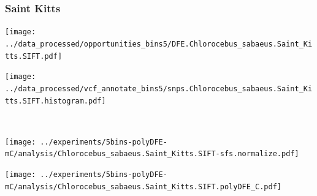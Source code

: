 \subsubsection{Saint Kitts}

\begin{minipage}{0.49\linewidth}
    \texttt{[image: ../data\_processed/opportunities\_bins5/DFE.Chlorocebus\_sabaeus.Saint\_Kitts.SIFT.pdf]}
\end{minipage}
\begin{minipage}{0.49\linewidth}
    \texttt{[image: ../data\_processed/vcf\_annotate\_bins5/snps.Chlorocebus\_sabaeus.Saint\_Kitts.SIFT.histogram.pdf]}
\end{minipage}
\\
\begin{minipage}{0.49\linewidth}
    \texttt{[image: ../experiments/5bins-polyDFE-mC/analysis/Chlorocebus\_sabaeus.Saint\_Kitts.SIFT-sfs.normalize.pdf]}
\end{minipage}
\begin{minipage}{0.4\linewidth}
    \texttt{[image: ../experiments/5bins-polyDFE-mC/analysis/Chlorocebus\_sabaeus.Saint\_Kitts.SIFT.polyDFE\_C.pdf]}
\end{minipage}
